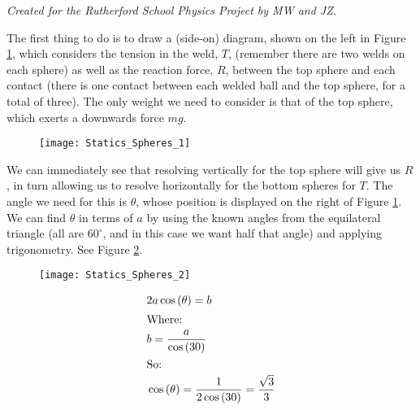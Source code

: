 
\begin{problem}
{
}
{\textit{Created for the Rutherford School Physics Project by MW and JZ.}}
{
The first thing to do is to draw a (side-on) diagram, shown on the left in Figure \ref{fig:Statics_Spheres_1}, which considers the tension in the weld, $T$, (remember there are two welds on each sphere) as well as the reaction force, $R$, between the top sphere and each contact (there is one contact between each welded ball and the top sphere, for a total of three). The only weight we need to consider is that of the top sphere, which exerts a downwards force $mg$.

\begin{figure}[h]
	\centering
	\texttt{[image: Statics\_Spheres\_1]}
	\caption{}	
	\label{fig:Statics_Spheres_1}
\end{figure}

We can immediately see that resolving vertically for the top sphere will give us $R$, in turn allowing us to resolve horizontally for the bottom spheres for $T$. The angle we need for this is $\theta$, whose position is displayed on the right of Figure \ref{fig:Statics_Spheres_1}. We can find $\theta$ in terms of $a$ by using the known angles from the equilateral triangle (all are $60 ^{\circ}$, and in this case we want half that angle) and applying trigonometry. See Figure \ref{fig:Statics_Spheres_2}. 

\begin{figure}[h]
	\centering
	\texttt{[image: Statics\_Spheres\_2]}
	\caption{}	
	\label{fig:Statics_Spheres_2}
\end{figure}

\begin{align*} &2a\cos{(\theta)} = b \\
\intertext{Where:}& b = \frac{a}{\cos{(30)}} \\
\intertext{So:} &\cos{(\theta)}= \frac{1}{2\cos{(30)}} = \frac{\sqrt{3}}{3}\\ \end{align*}

}
\end{problem}
